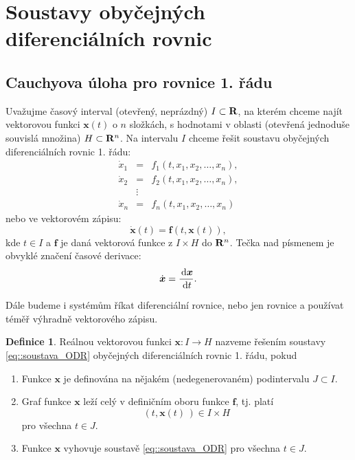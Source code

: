 \documentclass[a4paper, 12pt]{book}
\theoremstyle{definition}
\newtheorem{definition}[theorem]{Definice}
\def\to{\rightarrow}
\def\Real{{\rm\bf R}}
\def\d{\,{\rm d}}               %
\def\vc#1{\mathbf{\boldsymbol{#1}}}     %
\begin{document}
\section{Soustavy obyčejných diferenciálních rovnic}
\label{soustavy}

\subsection{Cauchyova úloha pro rovnice 1. řádu}
Uvažujme časový interval (otevřený, neprázdný) $I \subset \Real$, na kterém chceme najít vektorovou funkci $\vc x(t)$ o $n$ složkách, s hodnotami 
v oblasti (otevřená jednoduše souvislá množina) $H \subset \Real^n$. Na intervalu $I$ chceme řešit 
soustavu obyčejných diferenciálních rovnic 1. řádu:
\begin{eqnarray*}
\dot x_1 &=& f_1(t, x_1, x_2, \dots, x_n),\\
\dot x_2 &=& f_2(t, x_1, x_2, \dots, x_n),\\
&\vdots& \\
\dot x_n &=& f_n(t, x_1, x_2, \dots, x_n)
\end{eqnarray*}
nebo ve vektorovém zápisu:
\begin{equation}
    \label{eq::soustava_ODR}
    \dot{\vc x}(t) = \vc f(t, \vc x(t) ),
\end{equation}
kde $t\in I$ a $\vc f$ je daná vektorová funkce z $I\times H$ do $\Real^n$. Tečka nad písmenem je obvyklé značení časové derivace:
\[
    \dot{\vc x}= \frac{\d \vc x}{\d t}.
\]

Dále budeme i systémům říkat diferenciální rovnice, nebo jen rovnice a používat téměř výhradně vektorového zápisu.


\begin{definition}
Reálnou vektorovou funkci $\vc x: I \to H$ nazveme řešením soustavy \eqref{eq::soustava_ODR} 
obyčejných diferenciálních rovnic 1. řádu, pokud
\begin{enumerate}
\item Funkce $\vc x$ je definována na nějakém (nedegenerovaném) podintervalu $J\subset I$. 
\item Graf funkce $\vc x$ leží celý v definičním oboru funkce $\vc f$, tj. 
platí 
\[
    (t, \vc x (t)\,)  \in I \times H 
\]
 pro všechna $t\in J$.
\item Funkce $\vc x$ vyhovuje soustavě \eqref{eq::soustava_ODR} pro všechna $t\in J$. 
\end{enumerate}
\end{definition}
\end{document}
